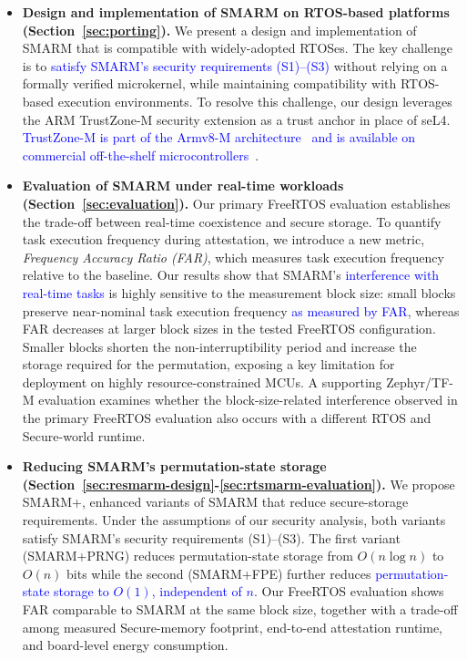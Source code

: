 \documentclass[journal]{IEEEtran}
\newcommand\ben[1]{\textcolor{blue}{#1}}
\newcommand{\rtsmarmone}{SMARM+PRNG\xspace}
\newcommand{\rtsmarmtwo}{SMARM+FPE\xspace}
\newcommand{\acron}{SMARM+\xspace}
\begin{document}
\begin{itemize}\sloppy
    \item \textbf{Design and implementation of SMARM on RTOS-based platforms (Section~\ref{sec:porting}).}
    We present a design and implementation of SMARM that is compatible with widely-adopted RTOSes.
     The key challenge is to \ben{satisfy SMARM's security requirements (S1)--(S3)} without relying on a formally verified microkernel, while maintaining compatibility with RTOS-based execution environments.
    To resolve this challenge, our design leverages the ARM TrustZone-M security extension as a trust anchor in place of seL4.
    \ben{TrustZone-M is part of the Armv8-M architecture~\cite{armv8m-arm} and is available on commercial off-the-shelf microcontrollers~\cite{tzm-sec-iot,stm32l552_nucleo144}}.
    
    \item \textbf{Evaluation of SMARM under real-time workloads (Section~\ref{sec:evaluation}).}
    Our primary FreeRTOS evaluation establishes the trade-off between real-time coexistence and secure storage.
    To quantify task execution frequency during attestation, we introduce a new metric, \emph{Frequency Accuracy Ratio (FAR)}, which measures task execution frequency relative to the baseline.
    Our results show that SMARM's \ben{interference with real-time tasks} is highly sensitive to the measurement block size: small blocks preserve near-nominal task execution frequency \ben{as measured by FAR}, whereas FAR decreases at larger block sizes in the tested FreeRTOS configuration.
    Smaller blocks shorten the non-interruptibility period and increase the storage required for the permutation, exposing a key limitation for deployment on highly resource-constrained MCUs.
    A supporting Zephyr/TF-M evaluation examines whether the block-size-related interference observed in the primary FreeRTOS evaluation also occurs with a different RTOS and Secure-world runtime.
 
 
    \item \textbf{Reducing SMARM's permutation-state storage (Section~\ref{sec:resmarm-design}-\ref{sec:rtsmarm-evaluation}).}
    We propose \acron, enhanced variants of SMARM that reduce secure-storage requirements.
    Under the assumptions of our security analysis, both variants satisfy SMARM's security requirements (S1)--(S3).
    The first variant (\rtsmarmone) reduces permutation-state storage from $O(n \log n)$ to $O(n)$ bits while the second (\rtsmarmtwo) further reduces \ben{permutation-state storage to $O(1)$, independent of $n$}.
    Our FreeRTOS evaluation shows FAR comparable to SMARM at the same block size, together with a trade-off among measured Secure-memory footprint, end-to-end attestation runtime, and board-level energy consumption.

\end{itemize}
\end{document}
